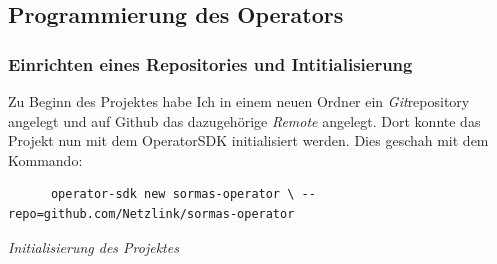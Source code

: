 \documentclass[a4paper,11pt]{article}
\begin{document}
    \subsection{Programmierung des Operators}
      \subsubsection{Einrichten eines Repositories und Intitialisierung}
      Zu Beginn des Projektes habe Ich in einem neuen Ordner ein \emph{Git}repository angelegt und auf Github 
      das dazugehörige \emph{Remote} angelegt. Dort konnte das Projekt nun mit dem OperatorSDK initialisiert
      werden. Dies geschah mit dem Kommando: 
      \begin{lstlisting}
      operator-sdk new sormas-operator \ --repo=github.com/Netzlink/sormas-operator
      \end{lstlisting}
      \emph{Initialisierung des Projektes}
\end{document}
